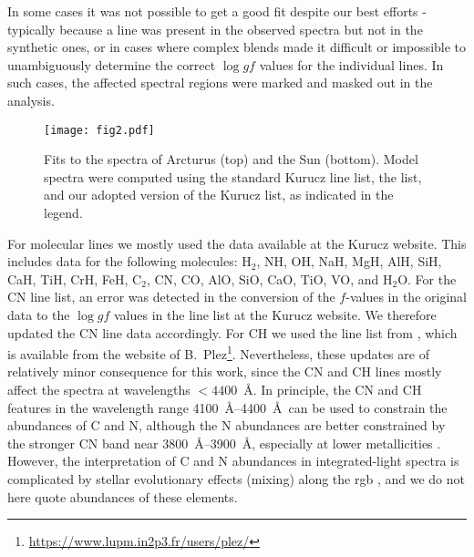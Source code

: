\documentclass{aa}
\begin{document}
In some cases it was not possible to get a good fit despite our best efforts - typically because a line was present in the observed spectra but not in the synthetic ones, or in cases where complex blends made it difficult or impossible to unambiguously determine the correct $\log gf$ values for the individual lines. In such cases, the affected spectral regions were marked and masked out in the analysis. 

\begin{figure}
\centering
\texttt{[image: fig2.pdf]}
\caption{\label{fig:Fe496e}Fits to the spectra of Arcturus (top) and the Sun (bottom). Model spectra were computed using the standard Kurucz line list, the \citet{Castelli2004} list, and our adopted version of the Kurucz list, as indicated in the legend.}
\end{figure}

For molecular lines we mostly used the data available at the Kurucz website.  This includes data for the following molecules: H$_2$, NH, OH, NaH, MgH, AlH, SiH, CaH, TiH, CrH, FeH, C$_2$, CN, CO, AlO, SiO, CaO, TiO, VO, and H$_2$O. For the CN line list, an error was detected in the conversion of the $f$-values in the original data \citep{Brooke2014} to the $\log gf$ values in the line list at the Kurucz website. We therefore updated the CN line data accordingly. For CH we used the line list from \citet{Masseron2014}, which is available from the website of B.\ Plez\footnote{\url{https://www.lupm.in2p3.fr/users/plez/}}.  
Nevertheless, these updates are of relatively minor consequence for this work, since the CN and CH lines mostly affect the spectra at wavelengths $<4400$~\AA. 
In principle, the CN and CH features in the wavelength range 4100~\AA --4400~\AA\ can be used to constrain the
abundances of C and N, although the N abundances are better constrained by the stronger CN band near 3800~\AA --3900~\AA, especially at lower metallicities \citep{Cohen2002,Graves2008,Lardo2012,Schiavon2013,Martocchia2021}. However, the interpretation of C and N abundances in integrated-light spectra is complicated by stellar evolutionary effects (mixing) along the \ac{rgb} \citep{Gratton2000,Martell2008}, and we do not here quote abundances of these elements. 
\end{document}
